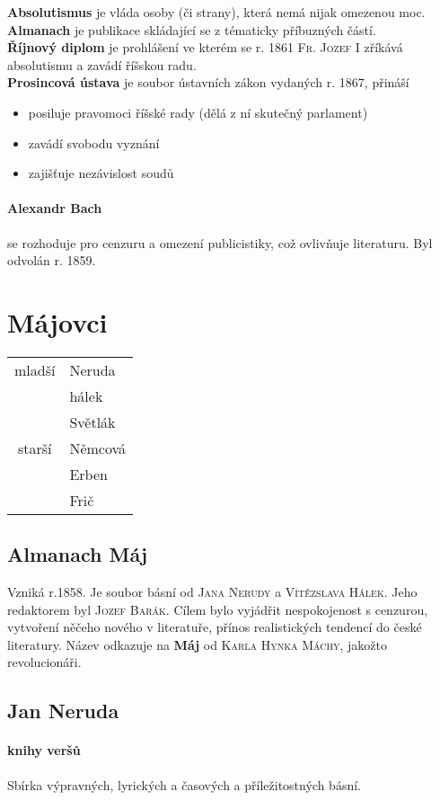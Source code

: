 \documentclass[10pt,a4page,headings,openany,%
oneside
,twocolumn
]{report}
\begin{document}
\textbf{Absolutismus} je vláda osoby (či strany), která nemá nijak omezenou moc.\\
\textbf{Almanach} je publikace skládající se z tématicky příbuzných částí.\\
\textbf{Říjnový diplom} je prohlášení ve kterém se r. 1861 \textsc{Fr. Jozef I} zříkává absolutismu a zavádí říšskou radu.\\
\textbf{Prosincová ústava} je soubor ústavních zákon vydaných r. 1867, přináší 
\begin{itemize}
\item posiluje pravomoci říšské rady (dělá z ní skutečný parlament)
\item zavádí svobodu vyznání
\item zajišťuje nezávislost soudů
\end{itemize}
\paragraph{Alexandr Bach} se rozhoduje pro cenzuru a omezení publicistiky, což ovlivňuje literaturu. Byl odvolán r. 1859.
\section{Májovci}
\begin{tabular}{cl}
mladší & Neruda \\ 
 & hálek \\ 
 & Světlák \\ 
\hline
starší & Němcová \\ 
 & Erben \\ 
 & Frič \\ 
\end{tabular} 
\subsection{Almanach Máj}
Vzniká r.1858.
Je soubor básní od \textsc{Jana Nerudy} a \textsc{Vítězslava Hálek}.
Jeho redaktorem byl \textsc{Jozef Barák}.
Cílem bylo vyjádřit nespokojenost s cenzurou, vytvoření něčeho nového v literatuře, přínos realistických tendencí do české literatury. Název odkazuje na \textbf{Máj} od \textsc{Karla Hynka Máchy}, jakožto revolucionáři.

\subsection{Jan Neruda}

\paragraph{knihy veršů}
Sbírka výpravných, lyrických a časových a příležitostných básní. 
\end{document}

